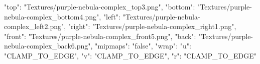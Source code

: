 {
  "top": "Textures/purple-nebula-complex_top3.png",
  "bottom": "Textures/purple-nebula-complex_bottom4.png",
  "left": "Textures/purple-nebula-complex_left2.png",
  "right": "Textures/purple-nebula-complex_right1.png",
  "front": "Textures/purple-nebula-complex_front5.png",
  "back": "Textures/purple-nebula-complex_back6.png",
  "mipmaps": "false",
  "wrap": {
    "u": "CLAMP_TO_EDGE",
    "v": "CLAMP_TO_EDGE",
    "r": "CLAMP_TO_EDGE"
  }
}